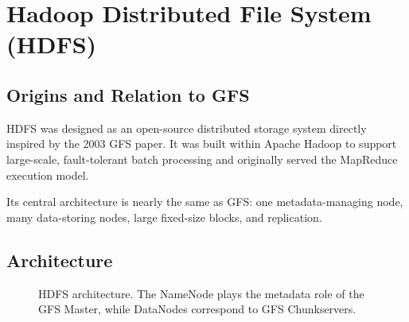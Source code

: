 \documentclass[11pt,a4paper,oneside]{book}
\begin{document}
\section{Hadoop Distributed File System (HDFS)}

\subsection{Origins and Relation to GFS}

HDFS was designed as an open-source distributed storage system directly inspired by the 2003 GFS paper. It was built within Apache Hadoop to support large-scale, fault-tolerant batch processing and originally served the MapReduce execution model.

Its central architecture is nearly the same as GFS: one metadata-managing node, many data-storing nodes, large fixed-size blocks, and replication.

\subsection{Architecture}

\begin{figure}[htbp]
\centering
{}
\caption{HDFS architecture. The NameNode plays the metadata role of the GFS Master, while DataNodes correspond to GFS Chunkservers.}
\label{fig:hdfs-architecture}
\end{figure}
\end{document}
